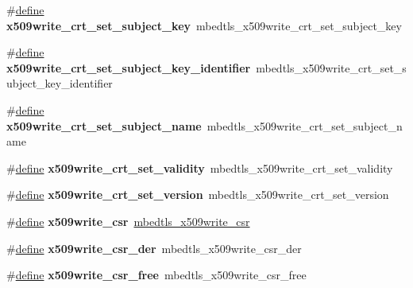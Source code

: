 \begin{DoxyCompactItemize}
\item 
\mbox{\label{compat-1_83_8h_a4a6fe20747a63fd7ba5467e89565f207}} 
\#\hyperlink{structdefine}{define} {\bfseries x509write\+\_\+crt\+\_\+set\+\_\+subject\+\_\+key}~mbedtls\+\_\+x509write\+\_\+crt\+\_\+set\+\_\+subject\+\_\+key
\item 
\mbox{\label{compat-1_83_8h_a6577eea2f76652079038594ebaed9588}} 
\#\hyperlink{structdefine}{define} {\bfseries x509write\+\_\+crt\+\_\+set\+\_\+subject\+\_\+key\+\_\+identifier}~mbedtls\+\_\+x509write\+\_\+crt\+\_\+set\+\_\+subject\+\_\+key\+\_\+identifier
\item 
\mbox{\label{compat-1_83_8h_afcc9372e84bd8436123f67518e2af6fe}} 
\#\hyperlink{structdefine}{define} {\bfseries x509write\+\_\+crt\+\_\+set\+\_\+subject\+\_\+name}~mbedtls\+\_\+x509write\+\_\+crt\+\_\+set\+\_\+subject\+\_\+name
\item 
\mbox{\label{compat-1_83_8h_aa49bab4a6acc7a15b215d0f468aef2bd}} 
\#\hyperlink{structdefine}{define} {\bfseries x509write\+\_\+crt\+\_\+set\+\_\+validity}~mbedtls\+\_\+x509write\+\_\+crt\+\_\+set\+\_\+validity
\item 
\mbox{\label{compat-1_83_8h_a195b0c9a2915f0d980bc821b83881af8}} 
\#\hyperlink{structdefine}{define} {\bfseries x509write\+\_\+crt\+\_\+set\+\_\+version}~mbedtls\+\_\+x509write\+\_\+crt\+\_\+set\+\_\+version
\item 
\mbox{\label{compat-1_83_8h_a78b7b5bdae4efa5a1adab6b71bcab202}} 
\#\hyperlink{structdefine}{define} {\bfseries x509write\+\_\+csr}~\hyperlink{structmbedtls__x509write__csr}{mbedtls\+\_\+x509write\+\_\+csr}
\item 
\mbox{\label{compat-1_83_8h_aa33cd42906707836cf05b7f66ae02637}} 
\#\hyperlink{structdefine}{define} {\bfseries x509write\+\_\+csr\+\_\+der}~mbedtls\+\_\+x509write\+\_\+csr\+\_\+der
\item 
\mbox{\label{compat-1_83_8h_aa9078026e55fb3da6af32586ee2a9e4f}} 
\#\hyperlink{structdefine}{define} {\bfseries x509write\+\_\+csr\+\_\+free}~mbedtls\+\_\+x509write\+\_\+csr\+\_\+free
\item 

\end{DoxyCompactItemize}
